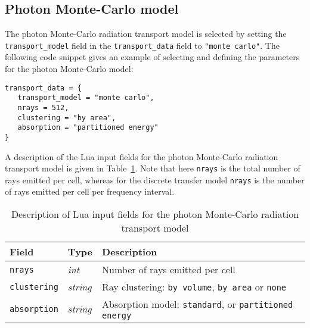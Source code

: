 \subsection{Photon Monte-Carlo model}

The photon Monte-Carlo radiation transport model is selected by setting the \texttt{transport\_model} field in the \texttt{transport\_data} field to \texttt{"monte carlo"}.
The following code snippet gives an example of selecting and defining the parameters for the photon Monte-Carlo model:

\noindent \topbar
\begin{lstlisting}[basicstyle=\ttfamily\normalsize]
transport_data = {
   transport_model = "monte carlo",
   nrays = 512,
   clustering = "by area",
   absorption = "partitioned energy"
}
\end{lstlisting}
\bottombar

A description of the Lua input fields for the photon Monte-Carlo radiation transport model is given in Table~\ref {tab:PMC-input}.
Note that here \texttt{nrays} is the total number of rays emitted per cell, whereas for the discrete transfer model \texttt{nrays} is the number of rays emitted per cell per frequency interval.

\begin{table}[h]
 \begin{center}
  \caption{Description of Lua input fields for the photon Monte-Carlo radiation transport model}
  \label{tab:PMC-input}
\begin{tabular}{llp{8cm}}
 \hline \hline
 Field                        & Type              &  Description \\ \hline
\texttt{nrays}            & \textit{int}       &  Number of rays emitted per cell \\
\texttt{clustering}    & \textit{string}  &  Ray clustering: \texttt{by volume}, \texttt{by area} or \texttt{none} \\
\texttt{absorption}  & \textit{string}  &   Absorption model: \texttt{standard}, or \texttt{partitioned energy} \\
\hline
\end{tabular}
\end{center}
\end{table}